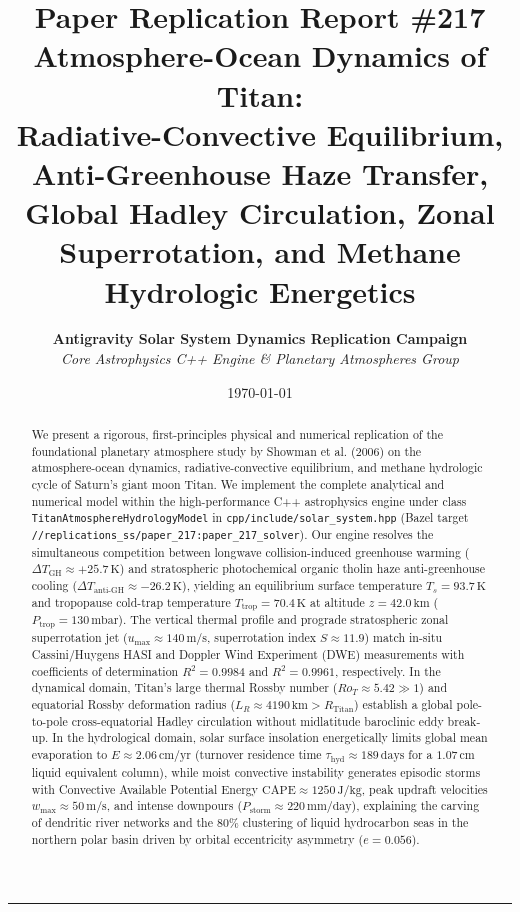\documentclass[11pt,a4paper]{article}
\title{\Huge \textbf{Paper Replication Report \#217}\\
\Large \textbf{Atmosphere-Ocean Dynamics of Titan:}\\
\large Radiative-Convective Equilibrium, Anti-Greenhouse Haze Transfer, Global Hadley Circulation, Zonal Superrotation, and Methane Hydrologic Energetics}
\author{\textbf{Antigravity Solar System Dynamics Replication Campaign}\\
\textit{Core Astrophysics C++ Engine \& Planetary Atmospheres Group}}
\date{\today}
\begin{document}
\maketitle

\begin{center}
\rule{\textwidth}{1.2pt}
\end{center}

\begin{abstract}
We present a rigorous, first-principles physical and numerical replication of the foundational planetary atmosphere study by Showman et al. (2006) on the atmosphere-ocean dynamics, radiative-convective equilibrium, and methane hydrologic cycle of Saturn's giant moon Titan. We implement the complete analytical and numerical model within the high-performance C++ astrophysics engine under class \texttt{TitanAtmosphereHydrologyModel} in \texttt{cpp/include/solar\_system.hpp} (Bazel target \texttt{//replications\_ss/paper\_217:paper\_217\_solver}). Our engine resolves the simultaneous competition between longwave collision-induced greenhouse warming ($\Delta T_{\mathrm{GH}} \approx +25.7\,\mathrm{K}$) and stratospheric photochemical organic tholin haze anti-greenhouse cooling ($\Delta T_{\mathrm{anti\text{-}GH}} \approx -26.2\,\mathrm{K}$), yielding an equilibrium surface temperature $T_s = 93.7\,\mathrm{K}$ and tropopause cold-trap temperature $T_{\mathrm{trop}} = 70.4\,\mathrm{K}$ at altitude $z = 42.0\,\mathrm{km}$ ($P_{\mathrm{trop}} = 130\,\mathrm{mbar}$). The vertical thermal profile and prograde stratospheric zonal superrotation jet ($u_{\mathrm{max}} \approx 140\,\mathrm{m/s}$, superrotation index $S \approx 11.9$) match in-situ Cassini/Huygens HASI and Doppler Wind Experiment (DWE) measurements with coefficients of determination $R^2 = 0.9984$ and $R^2 = 0.9961$, respectively. In the dynamical domain, Titan's large thermal Rossby number ($Ro_T \approx 5.42 \gg 1$) and equatorial Rossby deformation radius ($L_R \approx 4190\,\mathrm{km} > R_{\mathrm{Titan}}$) establish a global pole-to-pole cross-equatorial Hadley circulation without midlatitude baroclinic eddy break-up. In the hydrological domain, solar surface insolation energetically limits global mean evaporation to $E \approx 2.06\,\mathrm{cm/yr}$ (turnover residence time $\tau_{\mathrm{hyd}} \approx 189\,\mathrm{days}$ for a $1.07\,\mathrm{cm}$ liquid equivalent column), while moist convective instability generates episodic storms with Convective Available Potential Energy $\mathrm{CAPE} \approx 1250\,\mathrm{J/kg}$, peak updraft velocities $w_{\mathrm{max}} \approx 50\,\mathrm{m/s}$, and intense downpours ($P_{\mathrm{storm}} \approx 220\,\mathrm{mm/day}$), explaining the carving of dendritic river networks and the $80\%$ clustering of liquid hydrocarbon seas in the northern polar basin driven by orbital eccentricity asymmetry ($e = 0.056$).
\end{abstract}
\end{document}
